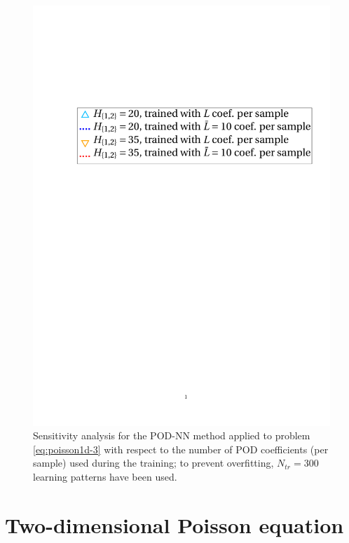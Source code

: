 \documentclass[12pt, a4paper, twoside, openright, notitlepage]{report}
\numberwithin{equation}{chapter}
\theoremstyle{theorem}
\theoremstyle{definition}
\theoremstyle{remark}
\theoremstyle{proposition}
\numberwithin{figure}{chapter}
\begin{document}
\begin{figure}[H]
			\includegraphics[scale = 0.42, trim = {2cm 11.25cm 1cm 3cm}, clip]{poisson1d_3_nn_test_legend}
			
			\caption{Sensitivity analysis for the POD-NN method applied to problem \eqref{eq:poisson1d-3} with respect to the number of POD coefficients (per sample) used during the training; to prevent overfitting, $N_{tr} = 300$ learning patterns have been used.}
			\label{fig:poisson1d-3-fig3}
		\end{figure}
		
	\clearpage
					
	\section{Two-dimensional Poisson equation}
	\label{section:Two-dimensional Poisson equation (results)}
	
\end{document}
